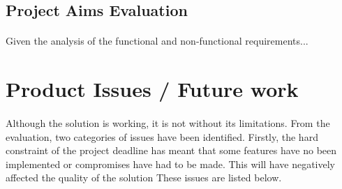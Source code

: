 \documentclass[12pt, conference, final, a4paper, onecolumn, compsoc]{IEEEtran}
\begin{document}
\subsection{Project Aims Evaluation}
\paragraph{}
Given the analysis of the functional and non-functional requirements...

\section{Product Issues / Future work} %
\paragraph{}

Although the solution is working, it is not without its limitations. From the
evaluation, two categories of issues have been identified. Firstly, the hard
constraint of the project deadline has meant that some features have no been
implemented or compromises have had to be made. This will have negatively
affected the quality of the solution These issues are listed below.
\end{document}
